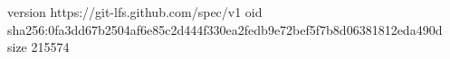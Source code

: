 version https://git-lfs.github.com/spec/v1
oid sha256:0fa3dd67b2504af6e85c2d444f330ea2fedb9e72bef5f7b8d06381812eda490d
size 215574
